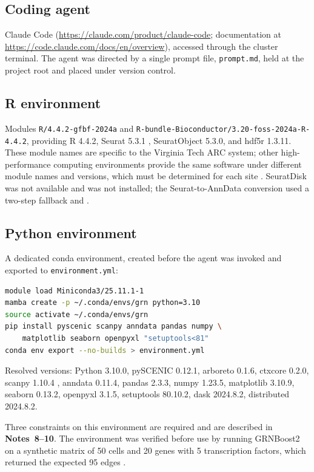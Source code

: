 \subsection{Coding agent}

Claude Code (\url{https://claude.com/product/claude-code}; documentation at \url{https://code.claude.com/docs/en/overview}), accessed through the cluster terminal. The agent was directed by a single prompt file, \texttt{prompt.md}, held at the project root and placed under version control.

\subsection{R environment}

Modules \texttt{R/4.4.2-gfbf-2024a} and \texttt{R-bundle-Bioconductor/3.20-foss-2024a-R-4.4.2}, providing R 4.4.2, Seurat 5.3.1 \cite{hao2024}, SeuratObject 5.3.0, and hdf5r 1.3.11. These module names are specific to the Virginia Tech ARC system; other high-performance computing environments provide the same software under different module names and versions, which must be determined for each site . SeuratDisk was not available and was not installed; the Seurat-to-AnnData conversion used a two-step fallback  and .

\subsection{Python environment}

A dedicated conda environment, created before the agent was invoked and exported to \texttt{environment.yml}:

\begin{lstlisting}[language=bash]
module load Miniconda3/25.11.1-1
mamba create -p ~/.conda/envs/grn python=3.10
source activate ~/.conda/envs/grn
pip install pyscenic scanpy anndata pandas numpy \
    matplotlib seaborn openpyxl "setuptools<81"
conda env export --no-builds > environment.yml
\end{lstlisting}

Resolved versions: Python 3.10.0, pySCENIC 0.12.1, arboreto 0.1.6, ctxcore 0.2.0, scanpy 1.10.4 \cite{wolf2018}, anndata 0.11.4, pandas 2.3.3, numpy 1.23.5, matplotlib 3.10.9, seaborn 0.13.2, openpyxl 3.1.5, setuptools 80.10.2, dask 2024.8.2, distributed 2024.8.2.

Three constraints on this environment are required and are described in \textbf{Notes~8--10}. The environment was verified before use by running GRNBoost2 on a synthetic matrix of 50 cells and 20 genes with 5 transcription factors, which returned the expected 95 edges .

